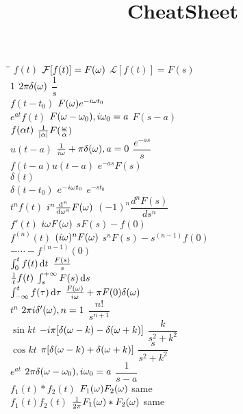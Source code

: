 \documentclass[UTF8,9pt]{ctexart}
\title{CheatSheet}
\newcommand{\Laplace}[1]{\ensuremath{\mathcal{L}{\left[#1\right]}}}
\begin{document}
 
\maketitle

\begin{tabbing}
\hspace{1.5 in}\=\hspace{1.5in}\= \kill
$f(t)$                                      \> $\mathcal{F}[f(t)]=F(\o)$        \> $\Laplace{f(t)}=F(s)$ \\
$1$       			                        \>$2\pi\de(\o)$        \> $\dfrac{1}{s}$            \\
$f(t-t_0)$                                  \>$F(\o)e^{-i\o t_0}$\\
$e^{at}f(t)$	                            \>$F(\o-\o_0),i\o_0=a$        \> $F(s-a)$	  \\ 
$f(\a t)$                                   \>$\ff{|\a|}F(\f{\o}{\a})$ \>\\
$u(t-a)$                                    \>$\ff{i\o}+\pi\de(\o),a=0$        \> $\dfrac{e^{-as}}{s}$  \\
$f(t-a)u(t-a)$                              \>        \> $e^{-as}F(s)$  \\
$\delta(t)$	                                          \\
$\delta(t-t_0)$                             \>$e^{-i\o t_0}$        \> $e^{-st_0}$  \\
$t^nf(t)$ 	                                \>$i^n\dd[n]{}{\o}F(\o)$      \> $(-1)^n\dfrac{d^nF(s)}{ds^n}$   \\
$f'(t)$ 	                                \>$i\o F(\o)$        \> $sF(s) - f(0)$  \\
$f^{(n)}(t)$ 	                            \>$(i\o)^nF(\o)$        \> $s^nF(s) - s^{(n-1)} f(0)$\\
            \>        \> $- \cdots - f^{(n-1)}(0)$  \\
$\int_0^t f(t)\d t$                         \>                                  \> $\f{F(s)}{s}$  \\
$\ff{t}f(t)$                                \>                                  \>$\int_s^{+\inf}F(s)\d s$\\
$\int_{-\inf}^tf(\tau)\d \tau$              \>$\f{F(\o)}{i\o}+\pi F(0)\de(\o)$          \\
$t^n$                                       \>$2\pi i\de'(\o),n=1$        \> $\dfrac{n!}{s^{n+1}}$     \\
$\sin kt$ 	                                \>$-i\pi[\de(\o-k)-\de(\o+k)]$        \> $\dfrac{k}{s^2+k^2}$  \\
$\cos kt$ 	                                \>$\pi[\de(\o-k)+\de(\o+k)]$        \> $\dfrac{s}{s^2+k^2}$  \\
$e^{at}$ 	                                \>$2\pi\de(\o-\o_0),i\o_0=a$        \> $\dfrac{1}{s-a}$ 	  \\
$f_1(t)*f_2(t)$                             \>$F_1(\o)F_2(\o)$                 \>same\\
$f_1(t)f_2(t)$                              \>$\ff{2\pi}F_1(\o)*F_2(\o)$       \>same
\end{tabbing}
\end{document}
